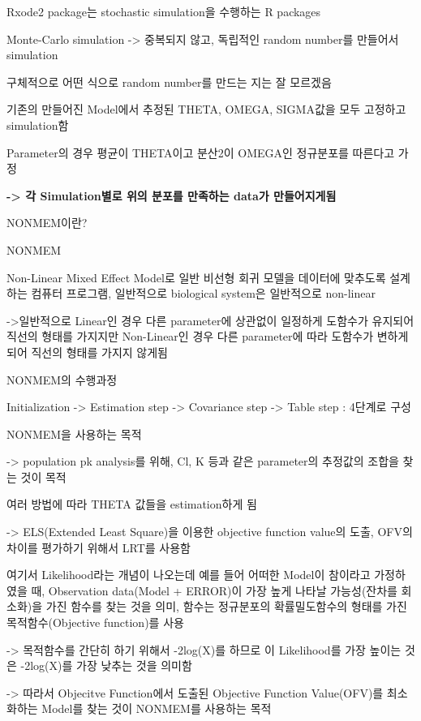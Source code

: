 \documentclass[
]{article}
\begin{document}
Rxode2 package는 stochastic simulation을 수행하는 R packages

Monte-Carlo simulation -\textgreater{} 중복되지 않고, 독립적인 random
number를 만들어서 simulation

구체적으로 어떤 식으로 random number를 만드는 지는 잘 모르겠음

기존의 만들어진 Model에서 추정된 THETA, OMEGA, SIGMA값을 모두 고정하고
simulation함

Parameter의 경우 평균이 THETA이고 분산2이 OMEGA인 정규분포를 따른다고
가정

\textbf{-\textgreater{} 각 Simulation별로 위의 분포를 만족하는 data가
만들어지게됨}

NONMEM이란?

NONMEM

Non-Linear Mixed Effect Model로 일반 비선형 회귀 모델을 데이터에
맞추도록 설계하는 컴퓨터 프로그램, 일반적으로 biological system은
일반적으로 non-linear

-\textgreater 일반적으로 Linear인 경우 다른 parameter에 상관없이
일정하게 도함수가 유지되어 직선의 형태를 가지지만 Non-Linear인 경우 다른
parameter에 따라 도함수가 변하게 되어 직선의 형태를 가지지 않게됨

NONMEM의 수행과정

Initialization -\textgreater{} Estimation step -\textgreater{}
Covariance step -\textgreater{} Table step : 4단계로 구성

NONMEM을 사용하는 목적

-\textgreater{} population pk analysis를 위해, Cl, K 등과 같은
parameter의 추정값의 조합을 찾는 것이 목적

여러 방법에 따라 THETA 값들을 estimation하게 됨

-\textgreater{} ELS(Extended Least Square)을 이용한 objective function
value의 도출, OFV의 차이를 평가하기 위해서 LRT를 사용함

여기서 Likelihood라는 개념이 나오는데 예를 들어 어떠한 Model이 참이라고
가정하였을 때, Observation data(Model + ERROR)이 가장 높게 나타날
가능성(잔차를 회소화)을 가진 함수를 찾는 것을 의미, 함수는 정규분포의
확률밀도함수의 형태를 가진 목적함수(Objective function)를 사용

-\textgreater{} 목적함수를 간단히 하기 위해서 -2log(X)를 하므로 이
Likelihood를 가장 높이는 것은 -2log(X)를 가장 낮추는 것을 의미함

-\textgreater{} 따라서 Objecitve Function에서 도출된 Objective Function
Value(OFV)를 최소화하는 Model를 찾는 것이 NONMEM를 사용하는 목적
\end{document}
